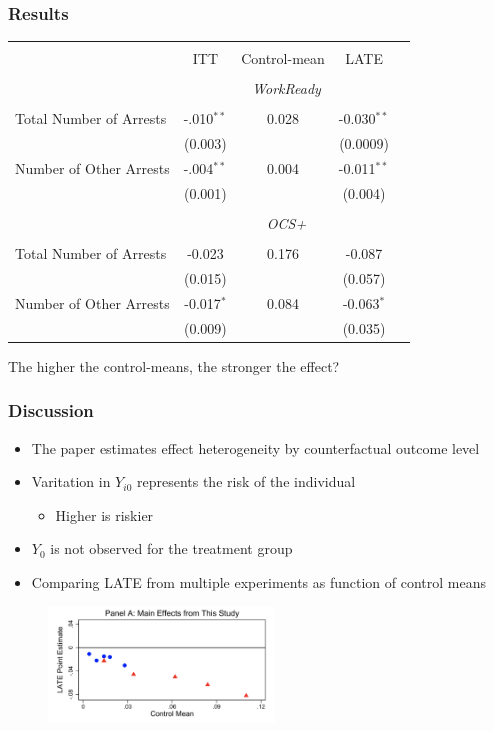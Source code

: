 \documentclass{beamer}
\begin{document}
\begin{frame}
\frametitle{Results}

\begin{table}[!htbp] \centering 
  \label{} 
\begin{tabular}{@{\extracolsep{5pt}}lcccc} 
\hline \\
[-1.8ex] & ITT & Control-mean & LATE \\ 
\hline \\[-1.8ex] 
 & \multicolumn{3}{c}{\textit{WorkReady}} \\ 
\cline{2-4} \\
Total Number of Arrests & -.010$^{**}$ & 0.028 & -0.030$^{**}$ \\ 
  & (0.003) & & (0.0009) \\
Number of Other Arrests & -.004$^{**}$ & 0.004 & -0.011$^{**}$ \\ 
  & (0.001) & & (0.004) \\
\cline{2-4} \\
[-1.8ex] & \multicolumn{3}{c}{\textit{OCS+}} \\ 
\cline{2-4} \\
Total Number of Arrests & -0.023 & 0.176 & -0.087 \\ 
  & (0.015) & & (0.057) \\
Number of Other Arrests & -0.017$^{*}$ & 0.084 & -0.063$^{*}$ \\ 
& (0.009) & & (0.035) \\
\hline
\end{tabular}
\end{table}
The higher the control-means, the stronger the effect?
\end{frame}

\begin{frame}
\frametitle{Discussion}
\begin{itemize}
\item The paper estimates effect heterogeneity by counterfactual outcome level
\item Varitation in $Y_{i0}$ represents the risk of the individual
\begin{itemize}
  \item Higher is riskier
\end{itemize}
\item $Y_0$ is not observed for the treatment group
\item Comparing LATE from multiple experiments as function of control means
\end{itemize}
\begin{figure}
\includegraphics[width=6cm]{fig/fig2.png}
\end{figure}
\end{frame}
\end{document}
